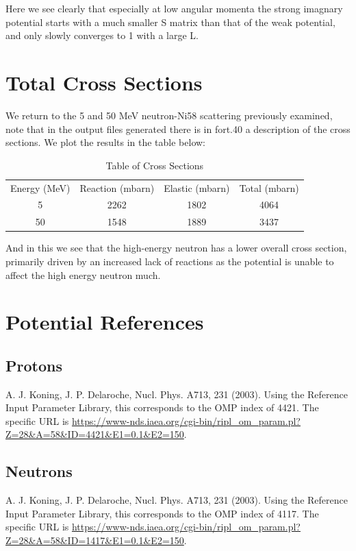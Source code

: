 \documentclass[paper=a4, fontsize=11pt]{scrartcl} %
\numberwithin{equation}{section} %
\numberwithin{figure}{section} %
\numberwithin{table}{section} %
\begin{document}
Here we see clearly that especially at low angular momenta the strong imagnary potential starts with a much smaller S matrix than that of the weak potential, and only slowly converges to 1 with a large L. \\

\section{Total Cross Sections}

We return to the 5 and 50 MeV neutron-Ni58 scattering previously examined, note that in the output files generated there is in fort.40 a description of the cross sections. We plot the results in the table below:\\

\begin{table}[hbt!]
\centering
\begin{tabular}{|c|c|c|c|}
Energy (MeV) & Reaction  (mbarn) & Elastic (mbarn)& Total (mbarn)\\
5 & 2262 & 1802 & 4064 \\
50 & 1548 &1889 & 3437 
\end{tabular}
\caption{Table of Cross Sections}
\end{table}

And in this we see that the high-energy neutron has a lower overall cross section, primarily driven by an increased lack of reactions as the potential is unable to affect the high energy neutron much.
\section{ Potential References}

\subsection{Protons} A. J. Koning, J. P. Delaroche, Nucl. Phys. A713, 231 (2003). Using the Reference Input Parameter Library, this corresponds to the OMP index of 4421. The specific URL is \url{https://www-nds.iaea.org/cgi-bin/ripl_om_param.pl?Z=28&A=58&ID=4421&E1=0.1&E2=150}.
\subsection{Neutrons}A. J. Koning, J. P. Delaroche, Nucl. Phys. A713, 231 (2003). Using the Reference Input Parameter Library, this corresponds to the OMP index of 4117. The specific URL is \url{https://www-nds.iaea.org/cgi-bin/ripl_om_param.pl?Z=28&A=58&ID=1417&E1=0.1&E2=150}.
\end{document}
